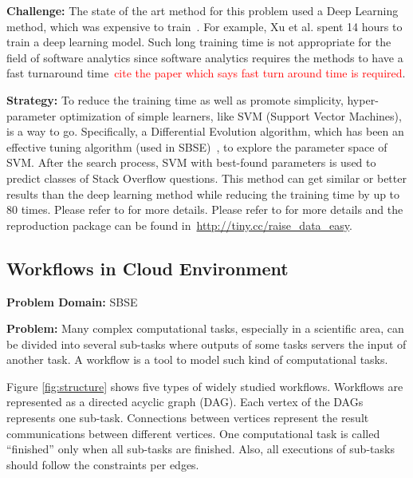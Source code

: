 \documentclass[table, xcdraw, sigconf,review, anonymous]{acmart}
\begin{document}
\noindent\textbf{Challenge: } The state of the art method for this problem used a Deep Learning method, which was expensive to train~\cite{xu2016predicting}. For example, Xu et al. spent 14 hours to train a deep learning model. Such long training time is not appropriate for the field of software analytics since software analytics requires the methods to have a fast turnaround time~\textcolor{red}{cite the paper which says fast turn around time is required}.

\noindent\textbf{Strategy: }To reduce the training time as well as promote simplicity, hyper-parameter optimization of simple learners, like SVM (Support Vector Machines), is a way to go. Specifically, a Differential Evolution algorithm, which has been an effective tuning algorithm (used in SBSE)~\cite{fu2016tuning},
to explore the parameter space of SVM. After the search process,
 SVM with best-found parameters is used to predict classes of Stack Overflow questions. This method can get similar or better results
than the deep learning method while reducing the training time by up to 80 times. Please refer to \cite{fu2017easy} for more details. Please refer to \cite{fu2017easy} for more details and the reproduction package can be found in~\url{http://tiny.cc/raise_data_easy}.



\subsection{Workflows in Cloud Environment}
\textbf{Problem Domain: } SBSE


\noindent\textbf{Problem:} Many complex computational tasks, especially in a scientific area, can be divided into several sub-tasks where outputs of some tasks servers the input of another task. A workflow is a tool to
model such kind of computational tasks.



Figure \ref{fig:structure} shows five types of widely studied workflows. Workflows are represented as a directed acyclic graph (DAG). Each vertex of the DAGs represents one sub-task. Connections between vertices represent the result communications between different vertices. One computational task is called ``finished'' only when
all sub-tasks are finished. Also, all executions of sub-tasks should follow the constraints per edges.
\end{document}
